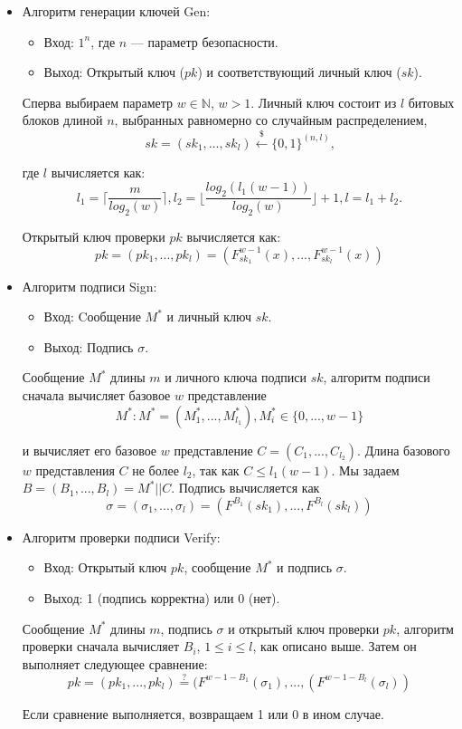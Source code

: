 \documentclass[a4paper, 14pt]{extarticle}
\begin{document}
\begin{itemize}
    \item Алгоритм генерации ключей Gen:

    \begin{itemize}
        \item Вход: $1^{n}$, где $n$ --- параметр безопасности.
        \item Выход: Открытый ключ ($pk$) и соответствующий личный ключ ($sk$).
    \end{itemize}

    Сперва выбираем параметр $w \in \mathbb{N}$, $w > 1$.
    Личный ключ состоит из $l$ битовых блоков длиной $n$, выбранных равномерно со случайным распределением, 
    \[sk = (sk_{1}, ..., sk_{l}) \stackrel{\$}\leftarrow \{0, 1\}^{(n,l)}\text{,}\]

    где $l$ вычисляется как:
    \[ l_{1} = \Bigg \lceil \frac{m}{log_{2}(w)} \Bigg \rceil, l_{2} = \Bigg \lfloor \frac{log_{2}(l_{1}(w - 1))}{log_{2}(w)} \Bigg \rfloor + 1, l = l_{1} + l_{2}. \]

    Открытый ключ проверки $pk$ вычисляется как:
    \[ pk = (pk_{1}, ..., pk_{l}) = (F^{w - 1}_{sk_{1}}(x), ..., F^{w - 1}_{sk_{l}}(x)) \]

    \item Алгоритм подписи Sign:

    \begin{itemize}
        \item Вход: Cообщение $M^{*}$ и личный ключ $sk$.
        \item Выход: Подпись $\sigma$.
    \end{itemize}

    Сообщение $M^{*}$ длины $m$ и личного ключа подписи $sk$, алгоритм подписи сначала вычисляет базовое $w$ представление
    \[M^{*}: M^{*} = (M^{*}_{1}, ..., M^{*}_{l_{1}}), M^{*}_{i} \in \{0, ..., w - 1\}\]

    и вычисляет его базовое $w$ представление $C = (C_{1}, ..., C_{l_2})$. Длина базового $w$ представления $C$ не более $l_{2}$, так как $C \leq l_{1}(w - 1)$. Мы задаем $B = (B_{1}, ..., B_{l}) = M^{*} || C$. Подпись вычисляется как
    \[ \sigma = (\sigma_{1}, ..., \sigma_{l}) = (F^{B_1}(sk_{1}), ..., F^{B_l}(sk_{l})) \]

    \item Алгоритм проверки подписи Verify:

    \begin{itemize}
        \item Вход: Открытый ключ $pk$, сообщение $M^{*}$ и подпись $\sigma$.
        \item Выход: 1 (подпись корректна) или 0 (нет).
    \end{itemize}

    Сообщение $M^{*}$ длины $m$, подпись $\sigma$ и открытый ключ проверки $pk$, алгоритм проверки сначала вычисляет $B_{i}$, $ 1 \leq i \leq l$, как описано выше. Затем он выполняет следующее сравнение:
    \[ pk = (pk_{1}, ..., pk_{l}) \stackrel{?}= (F^{w - 1 - B_{1}}(\sigma_{1}), ..., (F^{w - 1 - B_{l}}(\sigma_{l})) \]

    Если сравнение выполняется, возвращаем 1 или 0 в ином случае.
\end{itemize}
\end{document}
